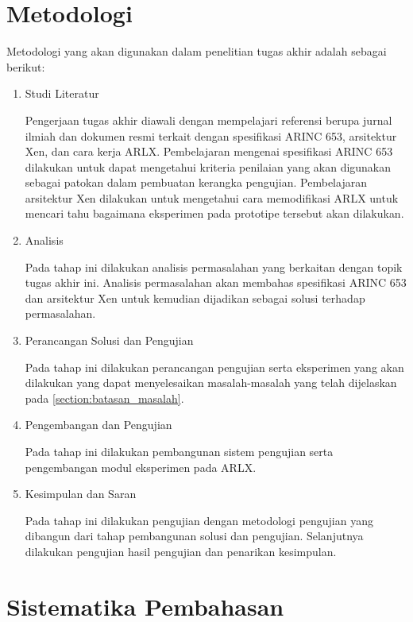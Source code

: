 \section{Metodologi}

Metodologi yang akan digunakan dalam penelitian tugas akhir adalah sebagai berikut:

\begin{enumerate}

    \item Studi Literatur

	Pengerjaan tugas akhir diawali dengan mempelajari referensi berupa jurnal ilmiah dan
	dokumen resmi terkait dengan spesifikasi ARINC 653, arsitektur Xen, dan cara kerja ARLX.
	Pembelajaran mengenai spesifikasi ARINC 653 dilakukan untuk dapat mengetahui kriteria
	penilaian yang akan digunakan sebagai patokan dalam pembuatan kerangka pengujian.
	Pembelajaran arsitektur Xen dilakukan untuk mengetahui cara memodifikasi ARLX untuk
	mencari tahu bagaimana eksperimen pada prototipe tersebut akan dilakukan.

    \item Analisis

	Pada tahap ini dilakukan analisis permasalahan yang berkaitan dengan topik tugas akhir
	ini.  Analisis permasalahan akan membahas spesifikasi ARINC 653 dan arsitektur Xen untuk
	kemudian dijadikan sebagai solusi terhadap permasalahan.

    \item Perancangan Solusi dan Pengujian

	Pada tahap ini dilakukan perancangan pengujian serta eksperimen yang akan dilakukan yang
	dapat menyelesaikan masalah\hyp{}masalah yang telah dijelaskan pada
	\autoref{section:batasan_masalah}.

    \item Pengembangan dan Pengujian

	Pada tahap ini dilakukan pembangunan sistem pengujian serta pengembangan modul
	eksperimen pada ARLX.

    \item Kesimpulan dan Saran

	Pada tahap ini dilakukan pengujian dengan metodologi pengujian yang dibangun dari tahap
	pembangunan solusi dan pengujian.  Selanjutnya dilakukan pengujian hasil pengujian dan
	penarikan kesimpulan.

\end{enumerate}

\section{Sistematika Pembahasan}

